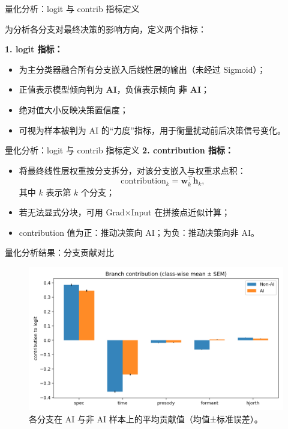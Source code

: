 \documentclass[aspectratio=169]{beamer}
\begin{document}
\begin{frame}{量化分析：logit 与 contrib 指标定义}

为分析各分支对最终决策的影响方向，定义两个指标：

\vspace{0.6em}
\textbf{1. logit 指标：}
\begin{itemize}
  \item 为主分类器融合所有分支嵌入后线性层的输出（未经过 Sigmoid）；
  \item 正值表示模型倾向判为 \textbf{AI}，负值表示倾向 \textbf{非 AI}；
  \item 绝对值大小反映决策置信度；
  \item 可视为样本被判为 AI 的“力度”指标，用于衡量扰动前后决策信号变化。
\end{itemize}

\end{frame}
\begin{frame}{量化分析：logit 与 contrib 指标定义}
\vspace{0.6em}
\textbf{2. contribution 指标：}
\begin{itemize}
  \item 将最终线性层权重按分支拆分，对该分支嵌入与权重求点积：
    \[
      \text{contribution}_k = \mathbf{w}_k^\top \mathbf{h}_k,
    \]
    其中 $k$ 表示第 $k$ 个分支；
  \item 若无法显式分块，可用 Grad$\times$Input 在拼接点近似计算；
  \item contribution 值为正：推动决策向 AI；为负：推动决策向非 AI。
\end{itemize}

\end{frame}

\begin{frame}{量化分析结果：分支贡献对比}
\begin{figure}
  \centering
  \includegraphics[width=0.7\linewidth]{images_in_paper/contrib_means_by_class.png}
  \caption{各分支在 AI 与非 AI 样本上的平均贡献值（均值±标准误差）。}
  \label{fig:contrib_means}
\end{figure}
\end{frame}
\end{document}
